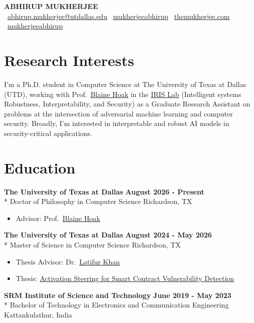 \documentclass[11pt,letterpaper]{article}
\newcommand{\educationitem}[4]{%
    \textbf{#1} \hfill \textbf{#2}\\*
    #3 \hfill #4
}
\newcommand{\blackhref}[2]{\href{#1}{\color{black}#2}}
\begin{document}
\RaggedRight
\begin{center}
    {\LARGE\textbf{ABHIRUP MUKHERJEE}}\\[7pt]
    \small
    \faEnvelope\ \href{mailto:abhirup.mukherjee@utdallas.edu}{abhirup.mukherjee@utdallas.edu} \quad
    \faLinkedin\ \href{https://linkedin.com/in/mukherjeeabhirup}{mukherjeeabhirup} \quad
    \faGlobe\ \href{https://themukherjee.com/}{themukherjee.com} \quad
    \faGithub\ \href{https://github.com/mukherjeeabhirup}{mukherjeeabhirup}
\end{center}

\section*{Research Interests}
I'm a Ph.D. student in Computer Science at The University of Texas at Dallas (UTD), working with Prof.\ \blackhref{https://hoak.me/}{Blaine Hoak} in the \blackhref{https://theirisresearchlab.com/}{IRIS Lab} (Intelligent systems Robustness, Interpretability, and Security) as a Graduate Research Assistant on problems at the intersection of adversarial machine learning and computer security. Broadly, I'm interested in interpretable and robust AI models in security-critical applications.

\section*{Education}
\educationitem{The University of Texas at Dallas}{August 2026 - Present}{Doctor of Philosophy in Computer Science}{Richardson, TX}
\begin{itemize}
    \item Advisor: Prof.\ \blackhref{https://hoak.me/}{Blaine Hoak}
\end{itemize}
\vspace{2pt}
\educationitem{The University of Texas at Dallas}{August 2024 - May 2026}{Master of Science in Computer Science}{Richardson, TX}
\begin{itemize}
    \item Thesis Advisor: Dr.\ \blackhref{https://personal.utdallas.edu/~lkhan/}{Latifur Khan}
    \item Thesis: \blackhref{https://www.proquest.com/docview/3354974136}{Activation Steering for Smart Contract Vulnerability Detection}
\end{itemize}
\vspace{2pt}
\educationitem{SRM Institute of Science and Technology}{June 2019 - May 2023}{Bachelor of Technology in Electronics and Communication Engineering}{Kattankulathur, India}
\end{document}
